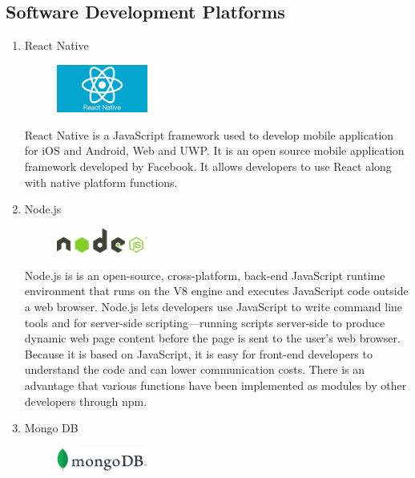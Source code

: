 \documentclass[conference]{IEEEtran}
\begin{document}
\subsection{Software Development Platforms}\label{AA}
\setlength{\parindent}{2ex}
\begin{enumerate}
\setlength{\parindent}{2ex}
\setlength{\parskip}{0.5em}
\item React Native
\par \begin{figure}[h!]
\includegraphics[width=3cm]{image/React Native.jpg}
\centering
\end{figure}

React Native is  a JavaScript framework used to develop mobile application for iOS and Android, Web and UWP. It is an open source mobile application framework developed by Facebook. It allows developers to use React along with native platform functions.

\item Node.js
\par \begin{figure}[h!]
\includegraphics[width=3cm]{image/Node.js.png}
\centering
\end{figure}

Node.js is is an open-source, cross-platform, back-end JavaScript runtime environment that runs on the V8 engine and executes JavaScript code outside a web browser. Node.js lets developers use JavaScript to write command line tools and for server-side scripting—running scripts server-side to produce dynamic web page content before the page is sent to the user's web browser. Because it is based on JavaScript, it is easy for front-end developers to understand the code and can lower communication costs. There is an advantage that various functions have been implemented as modules by other developers through npm.

\item Mongo DB
\par \begin{figure}[h!]
\includegraphics[width=3cm]{image/MongoDB.png}
\centering
\end{figure}


\end{enumerate}
\end{document}
